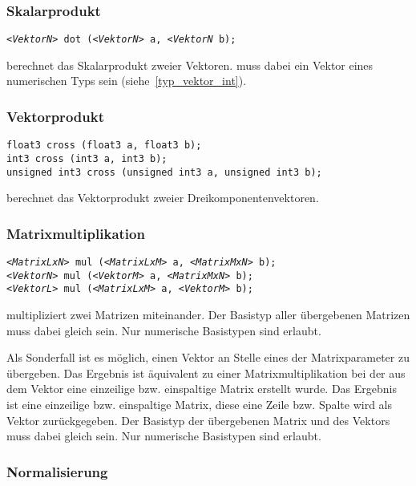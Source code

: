 \subsubsection{Skalarprodukt}

\texttt{\emph{<VektorN>} dot (\emph{<VektorN>} a, \emph{<VektorN} b);}

 berechnet das Skalarprodukt zweier Vektoren. 
muss dabei ein Vektor eines numerischen Typs sein (siehe~\ref{typ_vektor_int}).

\subsubsection{Vektorprodukt}
\texttt{float3 cross (float3 a, float3 b);}\\
\texttt{int3 cross (int3 a, int3 b);}\\
\texttt{unsigned int3 cross (unsigned int3 a, unsigned int3 b);}

 berechnet das Vektorprodukt zweier Dreikomponentenvektoren.

\subsubsection{Matrixmultiplikation}

\texttt{\emph{<MatrixLxN>} mul (\emph{<MatrixLxM>} a, \emph{<MatrixMxN>} b);}\\
\texttt{\emph{<VektorN>} mul (\emph{<VektorM>} a, \emph{<MatrixMxN>} b);}\\
\texttt{\emph{<VektorL>} mul (\emph{<MatrixLxM>} a, \emph{<VektorM>} b);}

 multipliziert zwei Matrizen miteinander. Der Basistyp aller
übergebenen Matrizen muss dabei gleich sein. Nur numerische Basistypen
sind erlaubt.

Als Sonderfall ist es möglich, einen Vektor an Stelle eines der Matrixparameter zu
übergeben. Das Ergebnis ist äquivalent zu einer Matrixmultiplikation bei der
aus dem Vektor eine einzeilige bzw. einspaltige Matrix erstellt wurde. Das
Ergebnis ist eine einzeilige bzw. einspaltige Matrix, diese eine Zeile bzw.
Spalte wird als Vektor zurückgegeben. Der Basistyp der übergebenen Matrix
und des Vektors muss dabei gleich sein. Nur numerische Basistypen sind erlaubt.

\subsubsection{Normalisierung}

